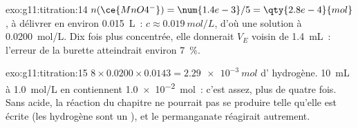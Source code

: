 \begin{solution}{exo:g11:titration:14}
$n(\ce{MnO4^-}) = \num{1.4e-3} / 5 = \qty{2.8e-4}{mol}$, à délivrer en
environ \qty{0.015}{L}~: $c \approx \qty{0.019}{mol/L}$, d'où une
solution à \qty{0.0200}{mol/L}. Dix fois plus concentrée, elle donnerait
$V_E$ voisin de \qty{1.4}{mL}~: l'erreur de la burette atteindrait
environ \qty{7}{\percent}.
\end{solution}

\begin{solution}{exo:g11:titration:15}
$8 \times 0.0200 \times 0.0143 = \qty{2.29e-3}{mol}$ d' hydrogène.
\qty{10}{mL} à \qty{1.0}{mol/L} en contiennent \qty{1.0e-2}{mol}~:
c'est assez, plus de quatre fois. Sans acide, la réaction du chapitre ne
pourrait pas se produire telle qu'elle est écrite (les  hydrogène
sont un ), et le permanganate réagirait autrement.
\end{solution}


